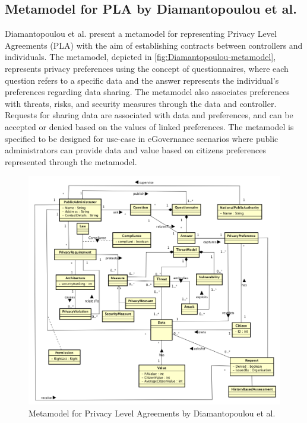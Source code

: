 \subsection{Metamodel for PLA by Diamantopoulou et al.}
Diamantopoulou et al. present a metamodel for representing Privacy Level Agreements (PLA) with the aim of establishing contracts between controllers and individuals.
The metamodel, depicted in \autoref{fig:Diamantopoulou-metamodel}, represents privacy preferences using the concept of questionnaires, where each question refers to a specific data and the answer represents the individual's preferences regarding data sharing. The metamodel also associates preferences with threats, risks, and security measures through the data and controller. Requests for sharing data are associated with data and preferences, and can be accepted or denied based on the values of linked preferences.
The metamodel is specified to be designed for use-case in eGovernance scenarios where public administrators can provide data and value based on citizens preferences represented through the metamodel.
\begin{figure}[htbp]
    \centering
    \includegraphics[width=\linewidth]{img/Diamantopoulou_metamodel.png}
    \caption{Metamodel for Privacy Level Agreements by Diamantopoulou et al. \cite{diamantopoulou_metamodel_2017}}
    \label{fig:Diamantopoulou-metamodel}
\end{figure}

